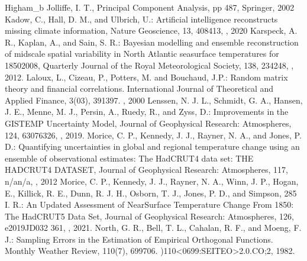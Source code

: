 \documentclass[letterpaper,10pt,english]{sphinxmanual}
\begin{document}
\begin{sphinxthebibliography}{Higham\_b}
\sphinxAtStartPar
Jolliffe, I. T., Principal Component Analysis, pp 487, Springer, 2002
\sphinxAtStartPar
Kadow, C., Hall, D. M., and Ulbrich, U.: Artificial intelligence reconstructs missing climate information, Nature Geoscience, 13, 408\textendash{}413, , 2020
\sphinxAtStartPar
Karspeck, A. R., Kaplan, A., and Sain, S. R.: Bayesian modelling and ensemble reconstruction of mid\sphinxhyphen{}scale spatial variability in North Atlantic sea\sphinxhyphen{}surface temperatures for 1850\sphinxhyphen{}2008, Quarterly Journal of the Royal Meteorological Society, 138, 234\textendash{}248, , 2012.
\sphinxAtStartPar
Laloux, L., Cizeau, P., Potters, M. and Bouchaud, J.P.: Random matrix theory and financial correlations. International Journal of Theoretical and Applied Finance, 3(03), 391\sphinxhyphen{}397. , 2000
\sphinxAtStartPar
Lenssen, N. J. L., Schmidt, G. A., Hansen, J. E., Menne, M. J., Persin, A., Ruedy, R., and Zyss, D.: Improvements in the GISTEMP Uncertainty Model, Journal of Geophysical Research: Atmospheres, 124, 6307\textendash{}6326, , 2019.
\sphinxAtStartPar
Morice, C. P., Kennedy, J. J., Rayner, N. A., and Jones, P. D.: Quantifying uncertainties in global and regional temperature change using an ensemble of observational estimates: The HadCRUT4 data set: THE HADCRUT4 DATASET, Journal of Geophysical Research: Atmospheres, 117, n/a\textendash{}n/a, , 2012
\sphinxAtStartPar
Morice, C. P., Kennedy, J. J., Rayner, N. A., Winn, J. P., Hogan, E., Killick, R. E., Dunn, R. J. H., Osborn, T. J., Jones, P. D., and Simpson, 285 I. R.: An Updated Assessment of Near\sphinxhyphen{}Surface Temperature Change From 1850: The HadCRUT5 Data Set, Journal of Geophysical Research: Atmospheres, 126, e2019JD032 361, , 2021.
\sphinxAtStartPar
North, G. R., Bell, T. L., Cahalan, R. F., and Moeng, F. J.: Sampling Errors in the Estimation of Empirical Orthogonal Functions. Monthly Weather Review, 110(7), 699\textendash{}706. )110\textless{}0699:SEITEO\textgreater{}2.0.CO;2, 1982.

\end{sphinxthebibliography}
\end{document}
